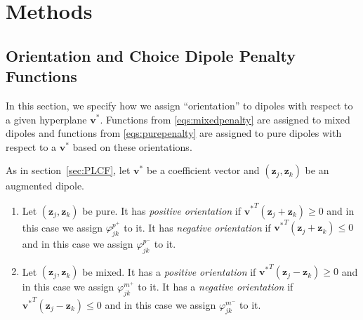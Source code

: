 \documentclass[sn-mathphys]{sn-jnl}%
\theoremstyle{thmstyleone}%
\theoremstyle{thmstyletwo}%
\theoremstyle{thmstylethree}%
\begin{document}

\section{Methods}

\subsection{Orientation and Choice Dipole Penalty Functions} \label{sec:OCDPF}

In this section, we specify how we assign ``orientation'' to dipoles with respect to a given hyperplane $\mathbf{v}^\ast$. Functions from \eqref{eqs:mixedpenalty} are assigned to mixed dipoles and functions from \eqref{eqs:purepenalty} are assigned to pure dipoles with respect to a $\mathbf{v}^\ast$ based on these orientations. 

As in section~\ref{sec:PLCF}, let $\mathbf{v}^\ast$ be a coefficient vector and $(\mathbf{z}_j, \mathbf{z}_k)$ be an augmented dipole.
\begin{enumerate}[(1)]
	\item Let $(\mathbf{z}_j, \mathbf{z}_k)$ be pure. It has \emph{positive orientation} if ${\mathbf{v}^{\ast}}^T (\mathbf{z}_j + \mathbf{z}_k) \geq 0$ and in this case we assign $\varphi^{p^+}_{jk}$ to it. It has \emph{negative orientation} if ${{\mathbf{v}^\ast}}^T (\mathbf{z}_j + \mathbf{z}_k) \leq 0$ and in this case we assign $\varphi^{p^-}_{jk}$ to it.
	\item Let $(\mathbf{z}_j, \mathbf{z}_k)$ be mixed. It has a \emph{positive orientation} if ${\mathbf{v}^{\ast}}^T (\mathbf{z}_j - \mathbf{z}_k) \geq 0$ and in this case we assign $\varphi^{m^+}_{jk}$ to it. It has a \emph{negative orientation} if ${{\mathbf{v}^\ast}}^T (\mathbf{z}_j - \mathbf{z}_k) \leq 0$ and in this case we assign $\varphi^{m^-}_{jk}$ to it.
\end{enumerate}
\end{document}
